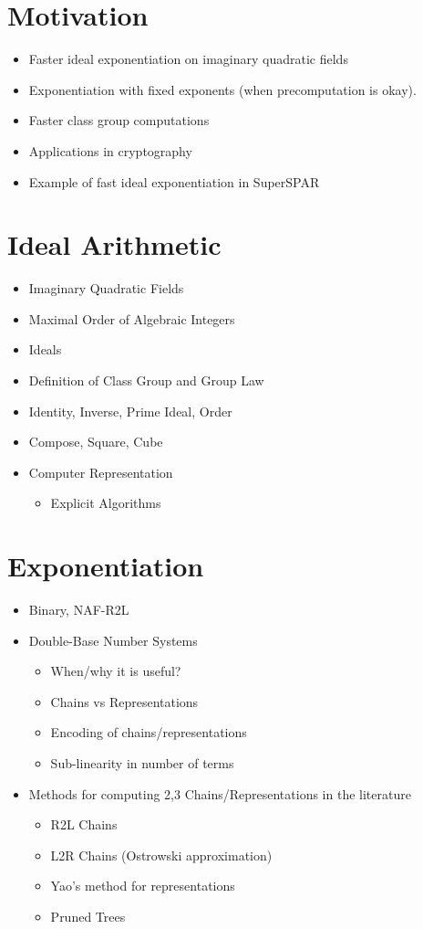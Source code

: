 \documentclass[11pt, letterpaper]{article}
\theoremstyle{definition}
\begin{document}
\section{Motivation}
\begin{itemize}
\item Faster ideal exponentiation on imaginary quadratic fields
\item Exponentiation with fixed exponents (when precomputation is okay).
\item Faster class group computations
\item Applications in cryptography
\item Example of fast ideal exponentiation in SuperSPAR
\end{itemize}


\bigbreak
\section{Ideal Arithmetic}
\begin{itemize}
\item Imaginary Quadratic Fields
\item Maximal Order of Algebraic Integers
\item Ideals
\item Definition of Class Group and Group Law
\item Identity, Inverse, Prime Ideal, Order
\item Compose, Square, Cube
\item Computer Representation
	\begin{itemize}
	\item Explicit Algorithms
	\end{itemize}
\end{itemize}

\bigbreak
\section{Exponentiation}
\begin{itemize}
\item Binary, NAF-R2L
\item Double-Base Number Systems
	\begin{itemize}
	\item When/why it is useful?
	\item Chains vs Representations
	\item Encoding of chains/representations
	\item Sub-linearity in number of terms
	\end{itemize}
\item Methods for computing 2,3 Chains/Representations in the literature
	\begin{itemize}
	\item R2L Chains
	\item L2R Chains (Ostrowski approximation)
	\item Yao's method for representations
	\item Pruned Trees
	\end{itemize}
\end{itemize}
\end{document}
